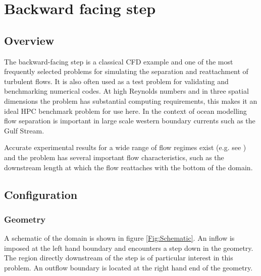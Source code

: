 
\section{Backward facing step}
\label{sect:backward_facing_step}


\subsection{Overview}
The backward-facing step is a classical CFD example and one of the most frequently selected
problems for simulating the separation and reattachment of turbulent flows.
It is also often used as a test problem for validating and benchmarking numerical codes.
At high Reynolds numbers and in three spatial dimensions the problem has substantial
computing requirements, this makes it an ideal HPC benchmark problem for use here.
In the context of ocean modelling flow separation is important
in large scale western boundary currents such as the Gulf Stream.

Accurate experimental results for a wide range of flow regimes exist
(e.g. see \cite{armaly1983}) and the problem has several important flow
characteristics, such as the downstream length at which the flow reattaches
with the bottom of the domain.


\subsection{Configuration}
\subsubsection{Geometry}
A schematic of the domain is shown in figure \ref{Fig:Schematic}.
An inflow is imposed at the left hand boundary and encounters a step
down in the geometry. The region directly downstream of the step is
of particular interest in this problem. An outflow boundary is located at the
right hand end of the geometry.



